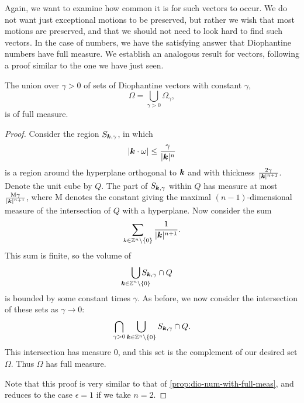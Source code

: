 \documentclass[twoside,letterpaper,11pt]{article}
\numberwithin{equation}{section}
\begin{document}
Again, we want to examine how common it is for such vectors to occur.
We do not want just exceptional motions to be preserved, but rather we wish that
most motions are preserved, and that we should not need to look hard to find
such vectors.
In the case of numbers, we have the satisfying answer that Diophantine numbers
have full measure.
We establish an analogous result for vectors, following a proof similar to the
one we have just seen.
\begin{prop}
  The union over $\gamma > 0$ of sets of Diophantine vectors with constant
  $\gamma$,
  \begin{equation*}
    \Omega = \bigcup_{\gamma > 0} \Omega_{\gamma},
  \end{equation*}
  is of full measure.
\end{prop}
\begin{proof}
  Consider the region $S_{\bm{k}, \gamma}$, in which
  \begin{equation*}
    |\bm{k} \cdot \omega| \leq \frac{\gamma}{|\bm{k}|^n}
  \end{equation*}
  is a region around the hyperplane orthogonal to $\bm{k}$ and with thickness
  $\frac{2\gamma}{|\bm{k}|^{n+1}}$.
  Denote the unit cube by $Q$.
  The part of $S_{\bm{k}, \gamma}$ within $Q$ has measure at most
  $\frac{\mathrm{M}\gamma}{|\bm{k}|^{n+1}}$, where $\mathrm{M}$ denotes the
  constant giving the maximal $(n-1)$-dimensional measure of the intersection of
  $Q$ with a hyperplane.
  Now consider the sum
  \begin{equation*}
    \sum_{k \in \mathbb{Z}^n \setminus \{0\}} \frac{1}{|\bm{k}|^{n+1}}.
  \end{equation*}
  This sum is finite, so the volume of
  \begin{equation*}
    \bigcup_{\mathclap{\bp{k} \in \Z^n \setminus \{0\}}} S_{\bp{k}, \gamma} \cap Q
  \end{equation*}
  is bounded by some constant times $\gamma$.
  As before, we now consider the intersection of these sets as $\gamma \to 0$:
  \begin{equation*}
     \bigcap_{\gamma > 0} \bigcup_{\bm{k} \in \mathbb{Z}^n \setminus \{0\}} S_{\bm{k},
       \gamma} \cap Q.
   \end{equation*}
   This intersection has measure $0$, and this set is the complement of our
   desired set $\Omega$.
   Thus $\Omega$ has full measure.

  Note that this proof is very similar to that of
  \cref{prop:dio-num-with-full-meas}, and reduces to the case $\epsilon = 1$ if
  we take $n = 2$.
\end{proof}
\end{document}
